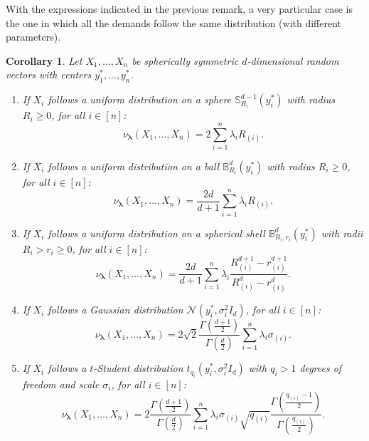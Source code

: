 \documentclass[letter,11pt, reqno]{amsart}
\newcommand{\B}{\mathbb{B}}
\renewcommand{\SS}{\mathbb{S}}
\renewcommand{\;}{\quad}
\theoremstyle{thmstyleone}%
\newtheorem{corollary}[theorem]{Corollary}%
\theoremstyle{thmstyletwo}%
\theoremstyle{thmstylethree}%
\begin{document}
With the expressions indicated in the previous remark, a very particular case is the one in which all the demands follow the same distribution (with different parameters).
\begin{corollary}
    Let $X_1, \ldots, X_n$ be spherically symmetric $d$-dimensional random vectors with centers $y_1^*, \ldots, y_n^*$. 
    \begin{enumerate}
    \item If $X_i$ follows a uniform distribution on a sphere $\SS^{d-1}_{R_i}(y_i^*)$ with radius $R_i\geq 0$, for all $i \in [n]$:
        \begin{equation*}
            \nu_{\bm{\lambda}}(X_1, \ldots,X_n) = 2 \sum_{i=1}^n \lambda_i R_{(i)}.
        \end{equation*}
        
        \item If $X_i$ follows a uniform distribution on a ball $\B^d_{R_i}(y_i^*)$ with radius $R_i\geq 0$, for all $i \in [n]$:
        \begin{equation*}
            \nu_{\bm{\lambda}}(X_1, \ldots,X_n) =  \frac{2d}{d+1} \sum_{i=1}^n \lambda_i R_{(i)}.
        \end{equation*}
        
        \item If $X_i$ follows a uniform distribution on a spherical shell $\B^d_{R_i,r_i}(y_i^*)$ with radii $R_i > r_i\geq 0$, for all $i \in [n]$:
        \begin{equation*}
            \nu_{\bm{\lambda}}(X_1, \ldots,X_n) = \frac{2d}{d+1} \sum_{i=1}^n \lambda_i \frac{R_{(i)}^{d+1} - r_{(i)}^{d+1}}{R_{(i)}^{d} - r_{(i)}^{d}}.
        \end{equation*}
        
        \item If $X_i$ follows a Gaussian distribution $\mathcal{N}(y_i^*,\sigma_i^2 I_d)$, for all $i \in [n]$:
        \begin{equation*}
            \nu_{\bm{\lambda}}(X_1, \ldots,X_n) = 2 \sqrt{2} \frac{\Gamma\left(\tfrac{d+1}{2}\right)}
     {\Gamma\left(\frac{d}{2}\right)} \sum_{i=1}^n \lambda_i  \sigma_{(i)}.
        \end{equation*}
        
\item If $X_i$ follows a $t$-Student distribution $t_{q_i}(y_i^*,\sigma_i^2 I_d)$
with $q_i>1$ degrees of freedom and scale $\sigma_i$, for all $i \in [n]$:
\begin{equation*}
    \nu_{\bm{\lambda}}(X_1, \ldots,X_n) = 2
\frac{\Gamma\left(\tfrac{d+1}{2}\right)}{\Gamma\left(\tfrac{d}{2}\right)}
 \sum_{i=1}^n \lambda_i \sigma_{(i)} \sqrt{q_{(i)}} \frac{\Gamma\left(\tfrac{q_{(i)}-1}{2}\right)}{\Gamma\left(\tfrac{q_{(i)}}{2}\right)}.
\end{equation*}

    \end{enumerate}
\end{corollary}
\end{document}
